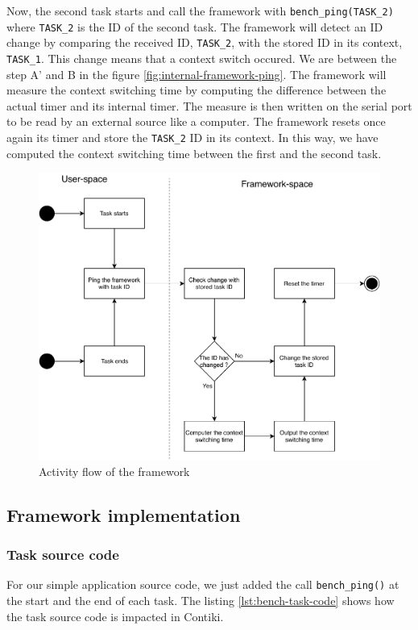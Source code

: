 Now, the second task starts and call the framework with \texttt{bench\_ping(TASK\_2)} where \texttt{TASK\_2} is the ID of the second task.
The framework will detect an ID change by comparing the received ID, \texttt{TASK\_2}, with the stored ID in its context, \texttt{TASK\_1}.
This change means that a context switch occured.
We are between the step A' and B in the figure \ref{fig:internal-framework-ping}.
The framework will measure the context switching time by computing the difference between the actual timer and its internal timer.
The measure is then written on the serial port to be read by an external source like a computer.
The framework resets once again its timer and store the \texttt{TASK\_2} ID in its context.
In this way, we have computed the context switching time between the first and the second task.

\begin{figure}[!ht]
  \centering
  \includegraphics[scale=0.7]{assets/extension-activity-framework.pdf}
  \caption{Activity flow of the framework\label{fig:extension-activity-framework}}
\end{figure}

\subsection{Framework implementation}

\subsubsection{Task source code}
For our simple application source code, we just added the call \texttt{bench\_ping()} at the start and the end of each task.
The listing \ref{lst:bench-task-code} shows how the task source code is impacted in Contiki.

